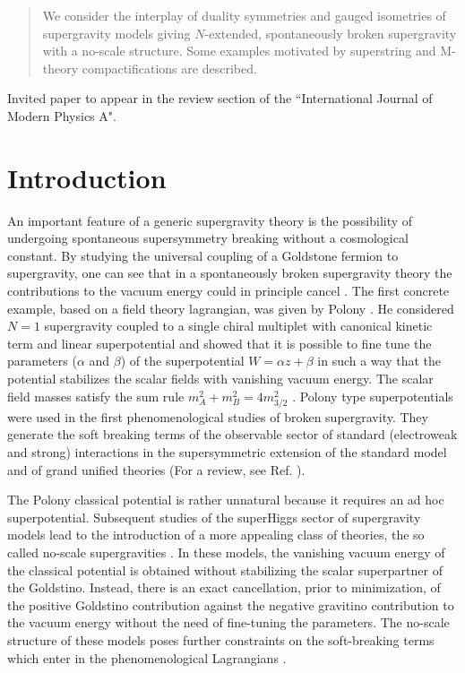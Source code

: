 \documentclass[a4paper,12pt]{article}
\begin{document}
\vskip 1.5cm

\begin{abstract}
We consider the interplay of duality symmetries and gauged isometries of supergravity models giving
$N$-extended, spontaneously broken supergravity with a no-scale structure. Some examples motivated by
 superstring and M-theory compactifications are described.
\end{abstract}

\vskip 1.5cm

Invited paper to appear in the review section of the
``International Journal of Modern Physics A".

 \vfill\eject


\section{Introduction}

An important feature of a generic supergravity theory is the
possibility of undergoing spontaneous supersymmetry breaking
without a cosmological constant. By studying the universal
coupling of a Goldstone fermion to supergravity, one can see that
in a spontaneously broken supergravity theory the contributions
to the vacuum energy could in principle cancel \cite{dz}. The
first concrete example, based on a field theory lagrangian, was
given by Polony \cite{po,cjsfgvn}. He considered $N=1$
supergravity coupled to a single chiral multiplet with canonical
kinetic term and linear superpotential and showed that it is
possible to fine tune the parameters ($\alpha$ and $\beta$) of the
superpotential $W=\alpha z+\beta$ in such a way that the potential
stabilizes the scalar fields with vanishing vacuum energy.
 The scalar field masses satisfy the sum rule $m_A^2+m_B^2=4m^2_{3/2}$ \cite{cjsfgvn}.
 Polony type superpotentials were used in the first phenomenological studies of broken
supergravity. They generate the soft breaking terms of the observable sector of standard
(electroweak and strong) interactions in the supersymmetric extension of the standard model
and of grand unified theories (For a review, see Ref. \cite{ni}).

 The Polony classical potential is rather unnatural because it requires an ad hoc
superpotential. Subsequent studies of the superHiggs sector  of supergravity models lead to
the introduction of a more appealing class of theories, the so called no-scale supergravities
\cite{cfkn,elnt}. In these models,  the vanishing vacuum energy of the classical potential is
obtained without stabilizing the scalar superpartner of the Goldstino.  Instead, there is an
exact cancellation, prior to minimization, of the positive Goldstino contribution against the
negative gravitino contribution to the vacuum energy  without the need of fine-tuning the
parameters.
 The no-scale structure of these models poses further constraints on the soft-breaking terms
which enter in the phenomenological Lagrangians \cite{ln}.
\end{document}
